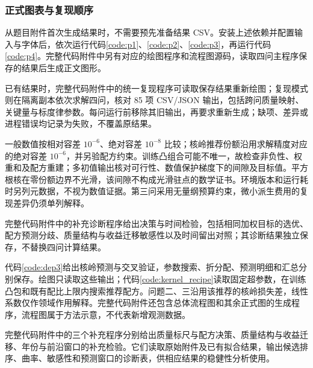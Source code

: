 \subsubsection*{正式图表与复现顺序}

从题目附件首次生成结果时，不需要预先准备结果 CSV。安装上述依赖并配置输入与字体后，依次运行代码\ref{code:p1}、\ref{code:p2}、\ref{code:p3}，再运行代码\ref{code:p4}。完整代码附件中另有对应的绘图程序和流程图源码，读取四问主程序保存的结果后生成正文图形。

已有结果时，完整代码附件中的统一复现程序可读取保存结果重新绘图；复现模式则在隔离副本依次求解四问，核对 85 项 CSV/JSON 输出，包括跨问质量映射、关键量与标度律参数。每问运行前移除其旧输出，再要求重新生成；缺项、差异或进程错误均记录为失败，不覆盖原结果。

一般数值按相对容差 $10^{-6}$、绝对容差 $10^{-8}$ 比较；核岭推荐份额沿用求解精度对应的绝对容差 $10^{-6}$，并另验配方约束。训练凸组合可能不唯一，故检查非负性、权重和及配方重建；多初值输出核对可行性、数值保护梯度下的间隙及目标值。平方根核在零份额边界不光滑，该间隙不构成光滑驻点的数学证书。环境版本和运行耗时另列元数据，不视为数值证据。第三问采用无量纲预算约束，微小派生费用的复现差异仍须单列解释。

完整代码附件中的补充诊断程序给出决策与时间检验，包括相同加权目标的选优、配方预测分歧、质量结构与收益迁移敏感性以及时间留出对照；其诊断结果独立保存，不替换四问计算结果。

代码\ref{code:dep3}给出核岭预测与交叉验证，参数搜索、折分配、预测明细和汇总分别保存。绘图只读取这些输出；代码\ref{code:kernel_recipe}读取固定超参数，在训练凸包和既有配比上限内搜索推荐配方。问题二、三沿用该推荐的核岭损失差，线性系数仅作领域作用解释。完整代码附件还包含总体流程图和其余正式图的生成程序，流程图属于方法示意，不代表新增观测数据。

完整代码附件中的三个补充程序分别给出质量标尺与配方决策、质量结构与收益迁移、年份与前沿窗口的补充检验。它们读取原始附件及已有拟合结果，输出候选排序、曲率、敏感性和预测窗口的诊断表，供相应结果的稳健性分析使用。

